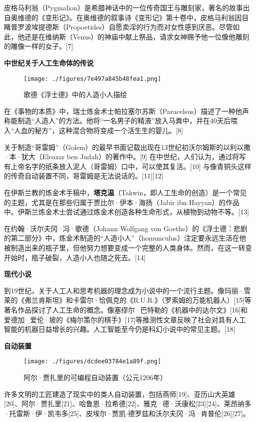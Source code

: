 皮格马利翁（Pygmalion）是希腊神话中的一位传奇国王与雕刻家，著名的故事出自奥维德的《变形记》。在奥维德的叙事诗《变形记》第十卷中，皮格马利翁因目睹普罗波埃提德斯（Propoetides）自愿卖淫的行为而对女性感到厌恶。尽管如此，他还是在维纳斯（Venus）的神庙中献上祭品，请求女神赐予他一位像他雕刻的雕像一样的女子。[7]

\textbf{中世纪关于人工生命体的传说}
\begin{figure}[ht]
\centering
\texttt{[image: ./figures/7e497a845b48fea1.png]}
\caption{歌德《浮士德》中的人造小人描绘} \label{fig_RGZN_1}
\end{figure}
在《事物的本质》中，瑞士炼金术士帕拉塞尔苏斯（Paracelsus）描述了一种他声称能制造“人造人”的方法。他将“一名男子的精液”放入马粪中，并在40天后喂入“人血的秘方”，这种混合物将变成一个活生生的婴儿。[8]

关于制造“哥雷姆”（Golem）的最早书面记载出现在13世纪初沃尔姆斯的以利以撒·本·犹大（Eleazar ben Judah）的著作中。[9] 在中世纪，人们认为，通过将写有上帝名字的纸条放入泥人（哥雷姆）口中，可以使其复活。[10] 与像青铜头这样的传奇自动装置不同，哥雷姆是无法说话的。[11][12]

在伊斯兰教的炼金术手稿中，\textbf{塔克温}（Takwin，即人工生命的创造）是一个常见的主题，尤其是在那些归属于贾比尔·伊本·海扬（Jabir ibn Hayyan）的作品中。伊斯兰炼金术士尝试通过炼金术创造各种生命形式，从植物到动物不等。[13]

在约翰·沃尔夫冈·冯·歌德（Johann Wolfgang von Goethe）的《浮士德：悲剧的第二部分》中，炼金术制造的“人造小人”（homunculus）注定要永远生活在他被制造出来的瓶子里，但他努力想要变成一个完整的人类身体。然而，在这一转变开始时，瓶子破裂，人造小人也随之死去。[14]

\textbf{现代小说}

到19世纪，关于人工人和思考机器的理念成为小说中的一个流行主题。像玛丽·雪莱的《弗兰肯斯坦》和卡雷尔·恰佩克的《R.U.R.》（罗索姆的万能机器人）[15]等著名作品探讨了人工生命的概念。像塞缪尔·巴特勒的《机器中的达尔文》[16]和爱德加·爱伦·坡的《梅尔策尔的棋手》[17]等推测性文章反映了社会对具有人工智能的机器日益增长的兴趣。人工智能至今仍是科幻小说中的常见主题。[18]

\textbf{自动装置}
\begin{figure}[ht]
\centering
\texttt{[image: ./figures/dcdee03784e1a89f.png]}
\caption{阿尔·贾扎里的可编程自动装置（公元1206年）} \label{fig_RGZN_2}
\end{figure}
许多文明的工匠建造了现实中的类人自动装置，包括燕师[19]、亚历山大英雄[20]、阿尔·贾扎里[21]、哈鲁恩·拉希德[22]、雅克·德·沃康松[23][24]、莱昂纳多·托雷斯·伊·凯韦多[25]、皮埃尔·贾凯-德罗兹和沃尔夫冈·冯·肯普伦[26][27]。

